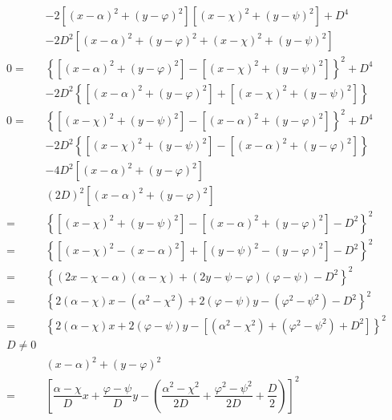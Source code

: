 \documentclass[
]{book}
\theoremstyle{definition}
\theoremstyle{definition}
\theoremstyle{definition}
\theoremstyle{definition}
\theoremstyle{remark}
\begin{document}
\[\begin{aligned}
 & -2\left[\left(x-\alpha\right)^{2}+\left(y-\varphi\right)^{2}\right]\left[\left(x-\chi\right)^{2}+\left(y-\psi\right)^{2}\right]+D^{4}\\
 & -2D^{2}\left[\left(x-\alpha\right)^{2}+\left(y-\varphi\right)^{2}+\left(x-\chi\right)^{2}+\left(y-\psi\right)^{2}\right]\\
0= & \left\{ \left[\left(x-\alpha\right)^{2}+\left(y-\varphi\right)^{2}\right]-\left[\left(x-\chi\right)^{2}+\left(y-\psi\right)^{2}\right]\right\} ^{2}+D^{4}\\
 & -2D^{2}\left\{ \left[\left(x-\alpha\right)^{2}+\left(y-\varphi\right)^{2}\right]+\left[\left(x-\chi\right)^{2}+\left(y-\psi\right)^{2}\right]\right\} \\
0= & \left\{ \left[\left(x-\chi\right)^{2}+\left(y-\psi\right)^{2}\right]-\left[\left(x-\alpha\right)^{2}+\left(y-\varphi\right)^{2}\right]\right\} ^{2}+D^{4}\\
 & -2D^{2}\left\{ \left[\left(x-\chi\right)^{2}+\left(y-\psi\right)^{2}\right]-\left[\left(x-\alpha\right)^{2}+\left(y-\varphi\right)^{2}\right]\right\} \\
 & -4D^{2}\left[\left(x-\alpha\right)^{2}+\left(y-\varphi\right)^{2}\right]\\
 & \left(2D\right)^{2}\left[\left(x-\alpha\right)^{2}+\left(y-\varphi\right)^{2}\right]\\
= & \left\{ \left[\left(x-\chi\right)^{2}+\left(y-\psi\right)^{2}\right]-\left[\left(x-\alpha\right)^{2}+\left(y-\varphi\right)^{2}\right]-D^{2}\right\} ^{2}\\
= & \left\{ \left[\left(x-\chi\right)^{2}-\left(x-\alpha\right)^{2}\right]+\left[\left(y-\psi\right)^{2}-\left(y-\varphi\right)^{2}\right]-D^{2}\right\} ^{2}\\
= & \left\{ \left(2x-\chi-\alpha\right)\left(\alpha-\chi\right)+\left(2y-\psi-\varphi\right)\left(\varphi-\psi\right)-D^{2}\right\} ^{2}\\
= & \left\{ 2\left(\alpha-\chi\right)x-\left(\alpha^{2}-\chi^{2}\right)+2\left(\varphi-\psi\right)y-\left(\varphi^{2}-\psi^{2}\right)-D^{2}\right\} ^{2}\\
= & \left\{ 2\left(\alpha-\chi\right)x+2\left(\varphi-\psi\right)y-\left[\left(\alpha^{2}-\chi^{2}\right)+\left(\varphi^{2}-\psi^{2}\right)+D^{2}\right]\right\} ^{2}\\
D\ne0\\
 & \left(x-\alpha\right)^{2}+\left(y-\varphi\right)^{2}\\
= & \left[\dfrac{\alpha-\chi}{D}x+\dfrac{\varphi-\psi}{D}y-\left(\dfrac{\alpha^{2}-\chi^{2}}{2D}+\dfrac{\varphi^{2}-\psi^{2}}{2D}+\dfrac{D}{2}\right)\right]^{2}
\end{aligned}
\]
\end{document}
